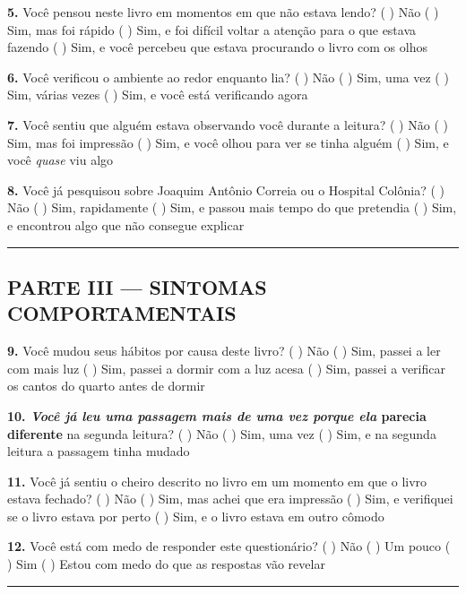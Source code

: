 \noindent \textbf{5.} Você pensou neste livro em momentos em que não estava lendo?
( ) Não
( ) Sim, mas foi rápido
( ) Sim, e foi difícil voltar a atenção para o que estava fazendo
( ) Sim, e você percebeu que estava procurando o livro com os olhos

\noindent \textbf{6.} Você verificou o ambiente ao redor enquanto lia?
( ) Não
( ) Sim, uma vez
( ) Sim, várias vezes
( ) Sim, e você está verificando agora

\noindent \textbf{7.} Você sentiu que alguém estava observando você durante a leitura?
( ) Não
( ) Sim, mas foi impressão
( ) Sim, e você olhou para ver se tinha alguém
( ) Sim, e você \textit{quase} viu algo

\noindent \textbf{8.} Você já pesquisou sobre Joaquim Antônio Correia ou o Hospital Colônia?
( ) Não
( ) Sim, rapidamente
( ) Sim, e passou mais tempo do que pretendia
( ) Sim, e encontrou algo que não consegue explicar

\vspace{0.5em}\noindent\rule{\textwidth}{0.5pt}\vspace{0.5em}

\subsection*{PARTE III --- SINTOMAS COMPORTAMENTAIS}

\noindent \textbf{9.} Você mudou seus hábitos por causa deste livro?
( ) Não
( ) Sim, passei a ler com mais luz
( ) Sim, passei a dormir com a luz acesa
( ) Sim, passei a verificar os cantos do quarto antes de dormir

\noindent \textbf{10.\textit{ Você já leu uma passagem mais de uma vez porque ela }parecia diferente} na segunda leitura?
( ) Não
( ) Sim, uma vez
( ) Sim, e na segunda leitura a passagem tinha mudado

\noindent \textbf{11.} Você já sentiu o cheiro descrito no livro em um momento em que o livro estava fechado?
( ) Não
( ) Sim, mas achei que era impressão
( ) Sim, e verifiquei se o livro estava por perto
( ) Sim, e o livro estava em outro cômodo

\noindent \textbf{12.} Você está com medo de responder este questionário?
( ) Não
( ) Um pouco
( ) Sim
( ) Estou com medo do que as respostas vão revelar

\vspace{0.5em}\noindent\rule{\textwidth}{0.5pt}\vspace{0.5em}

